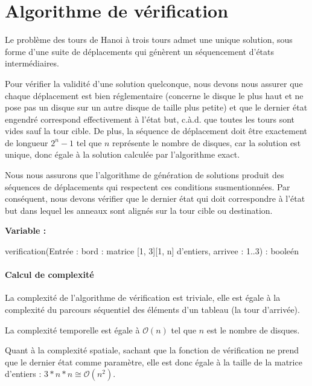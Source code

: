 \section{Algorithme de vérification}
Le problème des tours de Hanoi à trois tours admet une unique solution, sous forme d'une suite de déplacements qui génèrent un séquencement d'états intermédiaires.
\par
Pour vérifier la validité d'une solution quelconque, nous devons nous assurer que chaque déplacement est bien réglementaire (concerne le disque le plus haut et ne pose pas un disque sur un autre disque de taille plus petite) et que le dernier état engendré correspond effectivement à l'état but, c.à.d. que toutes les tours sont vides sauf la tour cible. De plus, la séquence de déplacement doit être exactement de longueur $2^{n} - 1$ tel que $n$ représente le nombre de disques, car la solution est unique, donc égale à la solution calculée par l'algorithme exact.
\par
Nous nous assurons que l'algorithme de génération de solutions produit des séquences de déplacements qui respectent ces conditions susmentionnées. Par conséquent, nous devons vérifier que le dernier état qui doit correspondre à l'état but dans lequel les anneaux sont alignés sur la tour cible ou destination.

\begin{function}[H]
    \textbf{Variable :}\\
    \caption{verification(Entrée : bord : matrice {[1, 3]}{[1, n]} d'entiers, arrivee : 1..3) : booleén}
\end{function}

\paragraph{Calcul de complexité}
La complexité de l'algorithme de vérification est triviale, elle est égale à la complexité du parcours séquentiel des éléments d'un tableau (la tour d'arrivée).
\par
La complexité temporelle est égale à $\mathcal{O}(n)$ tel que $n$ est le nombre de disques.
\par
Quant à la complexité spatiale, sachant que la fonction de vérification ne prend que le dernier état comme paramètre, elle est donc égale à la taille de la matrice d'entiers : $3 * n * n \cong \mathcal{O}(n^{2})$.

